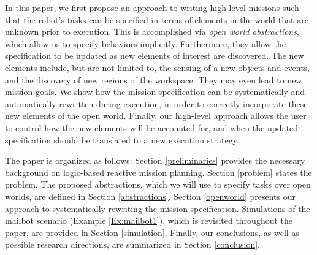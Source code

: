 In this paper, we first propose an approach to writing high-level missions such that the robot's tasks can be specified in terms of elements in the world that are unknown prior to execution. This is accomplished via \emph{open world abstractions}, which allow us to specify behaviors implicitly. 
Furthermore, they allow the specification to be updated as new elements of interest are discovered. The new elements include, but are not limited to, the sensing of a new objects and events, and the discovery of new regions of the workspace. They may even lead to new mission goals.
We show how the mission specification can be systematically and automatically rewritten during execution, in order to correctly incorporate these new elements of the open world. 
Finally, our high-level approach allows the user to control how the new elements will be accounted for, and when the updated specification should be translated to a new execution strategy. %

The paper is organized as follows: Section \ref{preliminaries} provides the necessary background on logic-based reactive mission planning. Section \ref{problem} states the problem. The proposed abstractions, which we will use to specify tasks over open worlds, are defined in Section \ref{abstractions}. Section \ref{openworld} presents our approach to systematically rewriting the mission specification. Simulations of the mailbot scenario (Example \ref{Ex:mailbot1}), which is revisited throughout the paper, are provided in Section \ref{simulation}. Finally, our conclusions, as well as possible research directions, are summarized in Section \ref{conclusion}.

